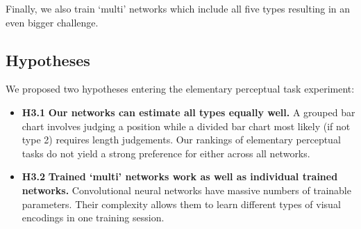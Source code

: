 Finally, we also train `multi' networks which include all five types resulting in an even bigger challenge.

\subsection{Hypotheses}

We proposed two hypotheses entering the elementary perceptual task experiment:

\begin{itemize}
  \item \textbf{H3.1} \textbf{Our networks can estimate all types equally well.} A grouped bar chart involves judging a position while a divided bar chart most likely (if not type 2) requires length judgements. Our rankings of elementary perceptual tasks do not yield a strong preference for either across all networks.
  \item \textbf{H3.2} \textbf{Trained `multi' networks work as well as individual trained networks.} Convolutional neural networks have massive numbers of trainable parameters. Their complexity allows them to learn different types of visual encodings in one training session. 
\end{itemize}


